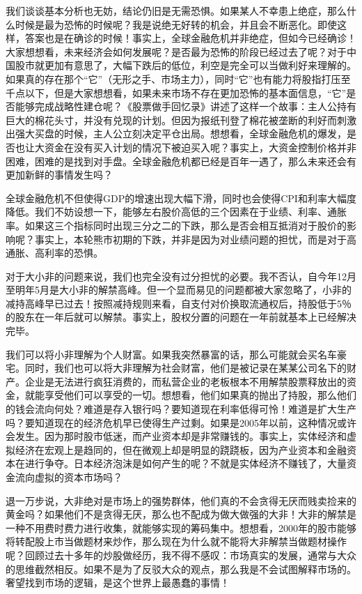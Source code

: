 我们谈谈基本分析也无妨，结论仍旧是无需恐惧。如果某人不幸患上绝症，那么什么时候是最为恐怖的时候呢？我是说绝无好转的机会，并且会不断恶化。即使这样，答案也是在确诊的时候！事实上，全球金融危机并非绝症，但如今已经确诊！大家想想看，未来经济会如何发展呢？是否最为恐怖的阶段已经过去了呢？对于中国股市就更加有意思了，大幅下跌后的低位，利空是完全可以当做利好来理解的。如果真的存在那个“它”（无形之手、市场主力），同时“它”也有能力将股指打压至千点以下，但是大家想想看，如果未来市场不存在更加恐怖的基本面信息，“它”是否能够完成战略性建仓呢？《股票做手回忆录》讲述了这样一个故事：主人公持有巨大的棉花头寸，并没有兑现的计划。但因为报纸刊登了棉花被垄断的利好而刺激出强大买盘的时候，主人公立刻决定平仓出局。想想看，全球金融危机的爆发，是否也让大资金在没有买入计划的情况下被迫买入呢？事实上，大资金控制价格并非困难，困难的是找到对手盘。全球金融危机都已经是百年一遇了，那么未来还会有更加新鲜的事情发生吗？

全球金融危机不但使得GDP的增速出现大幅下滑，同时也会使得CPI和利率大幅度降低。我们不妨设想一下，能够左右股价高低的三个因素在于业绩、利率、通胀率。如果这三个指标同时出现三分之二的下跌，那么是否会相互抵消对于股价的影响呢？事实上，本轮熊市初期的下跌，并非是因为对业绩问题的担忧，而是对于高通胀、高利率的恐惧。

对于大小非的问题来说，我们也完全没有过分担忧的必要。我不否认，自今年12月至明年5月是大小非的解禁高峰。但一个显而易见的问题都被大家忽略了，小非的减持高峰早已过去！按照减持规则来看，自支付对价换取流通权后，持股低于5％的股东在一年后就可以解禁。事实上，股权分置的问题在一年前就基本上已经解决完毕。

我们可以将小非理解为个人财富。如果我突然暴富的话，那么可能就会买名车豪宅。同时，我们也可以将大非理解为社会财富，他们是被记录在某某公司名下的财产。企业是无法进行疯狂消费的，而私营企业的老板根本不用解禁股票释放出的资金，就能享受他们可以享受的一切。想想看，他们如果真的抛出了持股，那么他们的钱会流向何处？难道是存入银行吗？要知道现在利率低得可怜！难道是扩大生产吗？要知道现在的经济危机早已使得生产过剩。如果是2005年以前，这种情况或许会发生。因为那时股市低迷，而产业资本却是非常赚钱的。事实上，实体经济和虚拟经济在宏观上是趋同的，但在微观上却是明显的跷跷板，因为产业资本和金融资本在进行争夺。日本经济泡沫是如何产生的呢？不就是实体经济不赚钱了，大量资金流向虚拟的资本市场吗？

退一万步说，大非绝对是市场上的强势群体，他们真的不会贪得无厌而贱卖捡来的黄金吗？如果他们不是贪得无厌，那么也不配成为做大做强的大非！大非的解禁是一种不用费时费力进行收集，就能够实现的筹码集中。想想看，2000年的股市能够将转配股上市当做题材来炒作，那么现在为什么就不能将大非解禁当做题材操作呢？回顾过去十多年的炒股做经历，我不得不感叹：市场真实的发展，通常与大众的思维截然相反。如果不是为了反驳大众的观点，那么我是不会试图解释市场的。奢望找到市场的逻辑，是这个世界上最愚蠢的事情！

